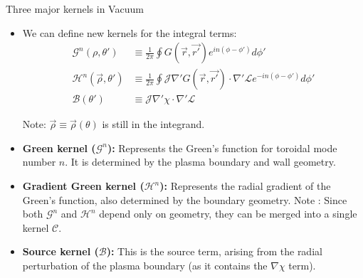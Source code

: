 \documentclass[8pt]{beamer}
\begin{document}
\begin{frame}{\color{white} Three major kernels in Vacuum}
\begin{itemize}
    \item We can define new kernels for the integral terms:
    \begin{align}
         \mathcal{G}^n(\rho,\theta') &\equiv \frac{1}{2\pi}\oint G(\vec{r},\vec{r'}) e^{in(\phi - \phi')} d\phi' \label{eq:G_kernel} \\
         \mathcal{H}^n (\vec{\rho}, \theta') &\equiv \frac{1}{2\pi} \oint \mathcal{J}\nabla'G(\vec{r},\vec{r'}) \cdot \nabla' \mathcal{L}e^{-in(\phi - \phi')} d\phi' \label{eq:H_kernel} \\
         \mathcal{B}(\theta') &\equiv \mathcal{J}\nabla'\chi\cdot\nabla'\mathcal{L} \label{eq:B_kernel}
    \end{align}
    
    Note: $\vec{\rho} \equiv \vec{\rho}(\theta)$ is still in the integrand.

    \item \textbf{Green kernel ($\mathcal{G}^n$):} Represents the Green's function for toroidal mode number $n$. It is determined by the plasma boundary and wall geometry.
    \item \textbf{Gradient Green kernel ($\mathcal{H}^n$):} Represents the radial gradient of the Green's function, also determined by the boundary geometry.
    Note : Since both $\mathcal{G}^n$ and $\mathcal{H}^n$ depend only on geometry, they can be merged into a single kernel $\mathcal{C}$.
    \item \textbf{Source kernel ($\mathcal{B}$):} This is the source term, arising from the radial perturbation of the plasma boundary (as it contains the $\nabla \chi$ term).
\end{itemize}
\end{frame}
\end{document}
